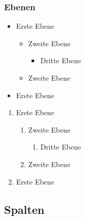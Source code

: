 \documentclass[t]{beamer}
\begin{document}
\begin{frame}
	\frametitle{Ebenen}
	\begin{itemize}
		\item Erste Ebene
			\begin{itemize}
				\item Zweite Ebene
				\begin{itemize}
					\item Dritte Ebene
				\end{itemize}
				\item Zweite Ebene
			\end{itemize}
		\item Erste Ebene
	\end{itemize}
	\begin{enumerate}	
		\item Erste Ebene
			\begin{enumerate}
				\item Zweite Ebene
				\begin{enumerate}
					\item Dritte Ebene
				\end{enumerate}
				\item Zweite Ebene
			\end{enumerate}
		\item Erste Ebene
	\end{enumerate}
\end{frame}

\subsection{Spalten} %
\end{document}
